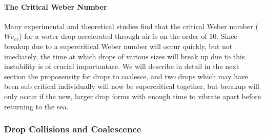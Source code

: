 \documentclass[10pt,a4paper]{article}
\begin{document}
\paragraph{The Critical Weber Number}
Many experimental and theoretical studies \citep{TARNOGRODZKI1993} find that the critical Weber number ($We_{cr}$) for a water drop accelerated through air is on the order of 10. Since breakup due to a supercritical Weber number will occur quickly, but not imediately, the time at which drops of various sizes will break up due to this instability is of crucial importantace. We will describe in detail in the next section the proposensity for drops to coalesce, and two drops which may have been sub critical individually will now be supercritical together, but breakup will only occur if the new, larger drop forms with enough time to vibrate apart before returning to the sea. 


\subsubsection{Drop Collisions and Coalescence}
\end{document}
